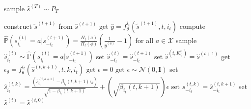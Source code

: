 \begin{algorithm}[ht]

\begin{algorithmic}

\STATE sample $\hat{s}^{(T)} \sim P_T$

\STATE construct $\tilde{s}^{(t+1)}$ from $\hat{s}^{(t+1)}$
\STATE get $\hat{y} = f_{\theta} ^{i_t} \left(\tilde{s}^{(t+1)}, t, i_{t} \right)$ 
\STATE compute $\hat{\mathbb{P}}\left(s^{(t)}_{i_t} = a | s^{(t+1)}_{-i_t} \right) = \frac{\Pi_t(a)}{\Pi_t(\phi)} \left( \frac{1}{\hat{y}^{(a)}} - 1 \right)$ for all $a \in
\mathcal{X}$ 
\STATE sample $\hat{s}^{(t)}_{i_t} \sim \hat{\mathbb{P}}\left(s^{(t)}_{i_t} = a | s^{(t+1)}_{-i_t} \right)$
\STATE set $\hat{s}^{(t)}_{-i_t} = \hat{s}^{(t+1)}_{-i_t}$
\ELSE
\STATE set $\hat{s}^{(t, K_{i_t}^t)} = \hat{s}^{(t+1)}$
\STATE get $\epsilon_{\theta} = f_{\theta} ^{i_t} \left(\hat{s}^{(t, k+1)}, t, k, i_t \right)$ 
\STATE get $\epsilon = 0$
\ELSE
\STATE get $\epsilon \sim \mathcal{N}(0, \mathbf{I})$
\ENDIF
\STATE set $\hat{s}^{(t, k)}_{i_t}  = \frac{\left(\hat{s}^{(t, k+1)}_{i_t} - {\beta_{i_t}}(t, k+1)\epsilon_{\theta} \right)}{\sqrt{1 - {\beta_{i_t}}(t, k+1)}} 
    + \left(\sqrt{{\beta_{i_t}}(t, k+1)}\right) \epsilon$
\STATE set $\hat{s}^{(t, k)}_{-i_t} = \hat{s}^{(t, k+1)}_{-i_t}$
\ENDFOR
\STATE set $\hat{s}^{(t)} = \hat{s}^{(t, 0)}$

\ENDIF

\ENDFOR

\end{algorithmic}

\end{algorithm}

\newpage
